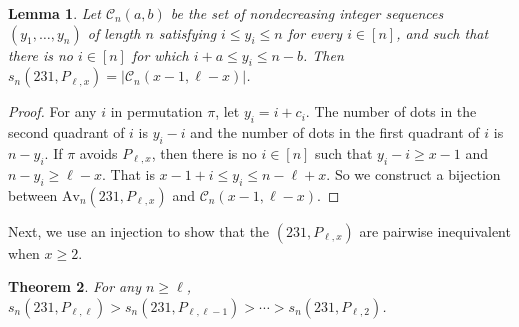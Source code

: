\documentclass[11pt]{article}
\newtheorem{thm}{Theorem}[section]
\newtheorem{lem}[thm]{Lemma}
\begin{document}
\begin{lem}\label{lem_231}
Let $\mathcal C_n(a,b)$ be the set of nondecreasing integer sequences
$(y_1,\dots,y_n)$ of length $n$ satisfying $i\leq y_i\leq n$ for every
$i\in[n]$, and such that there is no $i\in[n]$ for which
$i+a\leq y_i\leq n-b$. Then
$s_n(231,P_{\ell,x})=|\mathcal C_n(x-1,\ell-x)|$.\end{lem}

\begin{proof}
For any $i$ in permutation $\pi$, let $y_i=i+c_i$. The number of dots in
the second quadrant of $i$ is $y_i-i$ and the number of dots in
the first quadrant of $i$ is $n-y_i$. If $\pi$ avoids $P_{\ell,x}$, then
there is no $i\in[n]$ such that $y_i-i\ge x-1$ and $n-y_i\ge\ell-x$.
That is $x-1+i\le y_i\le n-\ell+x$. So we construct a bijection between
$\text{Av}_n(231,P_{\ell,x})$ and $\mathcal C_n(x-1,\ell-x)$.
\end{proof}
Next, we use an injection to show that the $(231,P_{\ell,x})$ are pairwise inequivalent 
when $x\ge 2$.
\begin{thm}\label{231_inj}
For any $n\ge\ell$, $s_n(231,P_{\ell,\ell})>s_n(231,P_{\ell,\ell-1})>\cdots>s_n(231,P_{\ell,2})$.
\end{thm}
\end{document}
